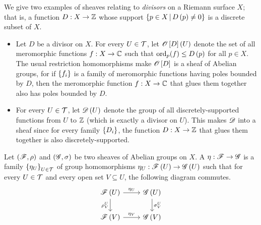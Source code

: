 \documentclass[../Moduli_Spaces_of_Riemann_Surfaces.tex]{subfiles}
\begin{document}
    \begin{example}
        We give two examples of sheaves relating to \textit{divisors} on a Riemann surface $X$; that is, a function $D:X\to\mathbb{Z}$ whose support $\left\{p\in X\,\middle\vert\, D\left(p\right)\neq0\right\}$ is a discrete subset of $X$.
        \begin{itemize}
            \item Let $D$ be a divisor on $X$. For every $U\in\mathcal{T}$, let $\mathscr{O}\left[D\right]\left(U\right)$ denote the set of all meromorphic functions $f:X\to\mathbb{C}$ such that $\operatorname{ord}_p\!\left(f\right)\leq D\left(p\right)$ for all $p\in X$. The usual restriction homomorphisms make $\mathscr{O}\left[D\right]$ is a sheaf of Abelian groups,  for if $\left\{f_i\right\}$ is a family of meromorphic functions having poles bounded by $D$, then the meromorphic function $f:X\to\mathbb{C}$ that glues them together also has poles bounded by $D$.
            \item For every $U\in\mathcal{T}$, let $\mathscr{D}\left(U\right)$ denote the group of all discretely-supported functions from $U$ to $\mathbb{Z}$ (which is exactly a divisor on $U$). This makes $\mathscr{D}$ into a sheaf since for every family $\left\{D_i\right\}$, the function $D:X\to\mathbb{Z}$ that glues them together is also discretely-supported.\exqed
        \end{itemize}
    \end{example}
    \begin{definition}
        Let $\left(\mathscr{F},\rho\right)$ and $\left(\mathscr{G},\sigma\right)$ be two sheaves of Abelian groups on $X$. A   $\eta:\mathscr{F}\to\mathscr{G}$ is a family $\left\{\eta_U\right\}_{U\in\mathcal{T}}$ of group homomorphisms $\eta_U:\mathscr{F}\left(U\right)\to\mathscr{G}\left(U\right)$ such that for every $U\in\mathcal{T}$ and every open set $V\subseteq U$, the following diagram commutes.
        \begin{equation*}
            \begin{tikzcd}
                \ms{F}\l(U\r) \ar[r, "\eta_U"] \ar[d, "\rho^U_V"'] & \ms{G}\l(U\r) \ar[d, "\sigma^U_V"] \\
                \ms{F}\l(V\r) \ar[r, "\eta_V"] & \ms{G}\l(V\r)
            \end{tikzcd}
        \end{equation*}
    \end{definition}
\end{document}
